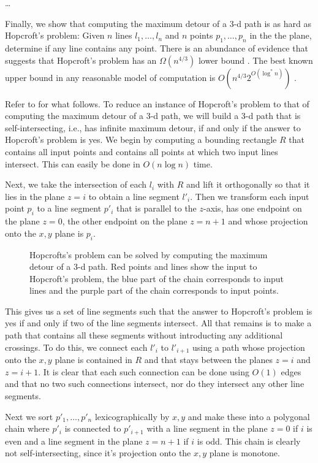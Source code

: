 \documentclass[lotsofwhite]{patmorin}
\begin{document}
\ldots

Finally, we show that computing the maximum detour of a 3-d path is as
hard as Hopcroft's problem: Given $n$ lines $l_1,\ldots,l_n$ and $n$
points $p_1,\ldots,p_n$ in the the plane, determine if any line
contains any point. There is an abundance of evidence that suggests
that Hopcroft's problem has an $\Omega(n^{4/3})$ lower bound
\cite{e95}.  The best known upper bound in any reasonable model of
computation is $O(n^{4/3}2^{O(\log^* n)})$ \cite{m93}.

Refer to  for what follows.  To reduce an instance of
Hopcroft's problem to that of computing the maximum detour of a 3-d
path, we will build a 3-d path that is self-intersecting, i.e., has
infinite maximum detour, if and only if the answer to Hopcroft's
problem is yes.  We begin by computing a bounding rectangle $R$ that
contains all input points and contains all points at which two input
lines intersect.  This can easily be done in $O(n\log n)$ time.

Next, we take the intersection of each $l_i$ with $R$ and lift it
orthogonally so that it lies in the plane $z=i$ to obtain a line
segment $l'_i$.  Then we transform each input point $p_i$ to a line
segment $p'_i$ that is parallel to the $z$-axis, has one endpoint on
the plane $z=0$, the other endpoint on the plane $z=n+1$ and whose
projection onto the $x,y$ plane is $p_i$.

\begin{figure}
\caption{Hopcrofts's problem can be solved by computing the maximum
detour of a 3-d path. Red points and lines show the input to
Hopcroft's problem, the blue part of the chain corresponds to input
lines and the purple part of the chain corresponds to input
points.}
\end{figure}

This gives us a set of line segments such that the answer to
Hopcroft's problem is yes if and only if two of the line segments
intersect.  All that remains is to make a path that contains all these
segments without introducting any additional crossings.  To do this,
we connect each $l'_i$ to $l'_{i+1}$ using a path whose projection onto
the $x,y$ plane is contained in $R$ and that stays between the planes
$z=i$ and $z=i+1$.  It is clear that each such connection can be done
using $O(1)$ edges and that no two such connections intersect, nor do
they intersect any other line segments.

Next we sort $p'_1,\ldots,p'_n$ lexicographically by $x,y$ and make
these into a polygonal chain where $p'_i$ is connected to $p'_{i+1}$
with a line segment in the plane $z=0$ if $i$ is even and a line
segment in the plane $z=n+1$ if $i$ is odd.  This chain is clearly not
self-intersecting, since it's projection onto the $x,y$ plane is
monotone.
\end{document}
